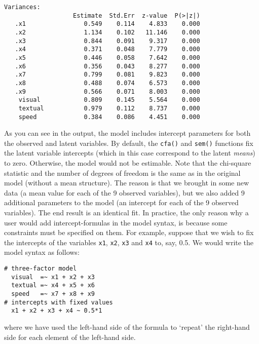 \begin{verbatim}
Variances:
                   Estimate  Std.Err  z-value  P(>|z|)
   .x1                0.549    0.114    4.833    0.000
   .x2                1.134    0.102   11.146    0.000
   .x3                0.844    0.091    9.317    0.000
   .x4                0.371    0.048    7.779    0.000
   .x5                0.446    0.058    7.642    0.000
   .x6                0.356    0.043    8.277    0.000
   .x7                0.799    0.081    9.823    0.000
   .x8                0.488    0.074    6.573    0.000
   .x9                0.566    0.071    8.003    0.000
    visual            0.809    0.145    5.564    0.000
    textual           0.979    0.112    8.737    0.000
    speed             0.384    0.086    4.451    0.000
\end{verbatim}

As you can see in the output, the model includes intercept parameters
for both the observed and latent variables. By default, the
\texttt{cfa()} and \texttt{sem()} functions fix the latent variable
intercepts (which in this case correspond to the latent \emph{means}) to
zero. Otherwise, the model would not be estimable. Note that the
chi-square statistic and the number of degrees of freedom is the same as
in the original model (without a mean structure). The reason is that we
brought in some new data (a mean value for each of the 9 observed
variables), but we also added 9 additional parameters to the model (an
intercept for each of the 9 observed variables). The end result is an
identical fit. In practice, the only reason why a user would add
intercept-formulas in the model syntax, is because some constraints must
be specified on them. For example, suppose that we wish to fix the
intercepts of the variables \texttt{x1}, \texttt{x2}, \texttt{x3} and
\texttt{x4} to, say, 0.5. We would write the model syntax as follows:

\begin{verbatim}
# three-factor model
  visual  =~ x1 + x2 + x3
  textual =~ x4 + x5 + x6
  speed   =~ x7 + x8 + x9
# intercepts with fixed values
  x1 + x2 + x3 + x4 ~ 0.5*1
\end{verbatim}

where we have used the left-hand side of the formula to `repeat' the
right-hand side for each element of the left-hand side.
